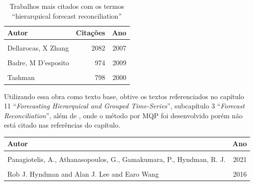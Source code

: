 \documentclass[
  12pt,
  oneside,
  a4paper,
  chapter=TITLE,
  section=TITLE,
  brazil]{abntex2}
\begin{document}
\begin{table}
\caption{Trabalhos mais citados com os termos ``hierarquical forecast
reconciliation''}\tabularnewline

\centering\begingroup\fontsize{10}{12}\selectfont

\begin{tabular}[t]{lrr}
\toprule
Autor & Citações & Ano\\
\midrule
\cellcolor{gray!6}{Hyndman, G Athanasopoulos} & \cellcolor{gray!6}{5222} & \cellcolor{gray!6}{2018}\\
Dellarocas, X Zhang & 2082 & 2007\\
\cellcolor{gray!6}{Hyndman, A Lee, E Wang, S Wickramasuriya} & \cellcolor{gray!6}{1023} & \cellcolor{gray!6}{2013}\\
Badre, M D'esposito & 974 & 2009\\
\cellcolor{gray!6}{Hong, S Fan} & \cellcolor{gray!6}{912} & \cellcolor{gray!6}{2016}\\
\addlinespace
Tashman & 798 & 2000\\
\bottomrule
\end{tabular}
\endgroup{}
\end{table}

Utilizando essa obra como texto base, obtive os textos referenciados no
capítulo 11 ``\emph{Forecasting Hierarquical and Grouped Time-Series}'',
subcapítulo 3 ``\emph{Forecast Reconciliation}'', além de
\textcite{hyndman_fast_2016}, onde o método por MQP foi desenvolvido
porém não está citado nas referências do capítulo.

\begin{quadro}
\caption{Artigos de referência em Hyndman e Athanasopoulos (2021)}\tabularnewline

\centering\begingroup\fontsize{10}{12}\selectfont

\begin{tabular}[t]{lr}
\toprule
Autor & Ano\\
\midrule
\cellcolor{gray!6}{Hyndman, R. J., Ahmed, R. A., Athanasopoulos, G., Shang, H. L.} & \cellcolor{gray!6}{2011}\\
Panagiotelis, A., Athanasopoulos, G., Gamakumara, P., Hyndman, R. J. & 2021\\
\cellcolor{gray!6}{Wickramasuriya, S. L., Athanasopoulos, G., Hyndman, R. J.} & \cellcolor{gray!6}{2019}\\
Rob J. Hyndman and Alan J. Lee and Earo Wang & 2016\\
\bottomrule
\end{tabular}
\endgroup{}
\end{quadro}
\end{document}
